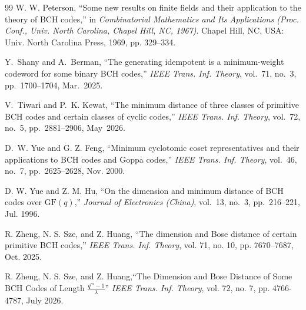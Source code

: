 \documentclass[journal,onecolumn]{IEEEtran}
\begin{document}
\begin{thebibliography}{99}
W. W. Peterson, ``Some new results on finite fields and their application
to the theory of BCH codes,'' in \emph{Combinatorial Mathematics and Its
Applications (Proc. Conf., Univ. North Carolina, Chapel Hill, NC, 1967)}.
Chapel Hill, NC, USA: Univ. North Carolina Press, 1969, pp. 329--334.



Y.~Shany and A.~Berman,
``The generating idempotent is a minimum-weight codeword for some binary BCH codes,''
\emph{IEEE Trans. Inf. Theory}, vol.~71, no.~3, pp.~1700--1704, Mar.~2025.

 

V.~Tiwari and P.~K. Kewat,
``The minimum distance of three classes of primitive BCH codes and certain classes of cyclic codes,''
\emph{IEEE Trans. Inf. Theory}, vol.~72, no.~5, pp.~2881--2906, May~2026.

D.~W. Yue and G. Z. Feng, ``Minimum cyclotomic coset representatives and their
  applications to BCH codes and Goppa codes,'' {\em IEEE Trans. Inf. Theory}, vol.~46, no.~7, pp.~2625--2628, Nov. 2000.




D. W. Yue and Z. M. Hu, ``On the dimension and minimum distance of BCH
  codes over $\mathrm{GF}(q)$,'' {\em Journal of Electronics (China)}, vol.~13, no.~3,
  pp.~216--221, Jul.  1996.


R. Zheng, N. S. Sze, and Z. Huang, ``The dimension and Bose distance of
certain primitive BCH codes,'' \emph{IEEE Trans. Inf. Theory}, vol. 71,
no. 10, pp. 7670--7687, Oct. 2025.

R. Zheng, N. S. Sze, and Z. Huang,``The Dimension and Bose Distance of Some 
BCH Codes of Length  $\frac{q^m-1}{\lambda}$''
\emph{IEEE Trans. Inf. Theory}, vol. 72, no. 7, pp. 4766-4787, July 2026. 


\end{thebibliography}
\end{document}
